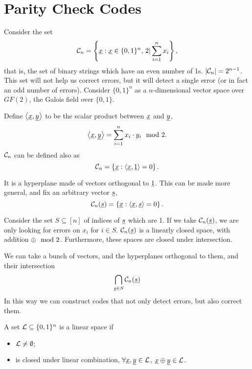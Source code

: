 \section{Parity Check Codes}

Consider the set
\begin{equation*}
	\mathcal{C}_n
	=
	\left\{
		\underline{x} : \underline{x} \in \{0, 1\}^n, \,
		2 | \sum_{i=1}^n x_i
	\right\},
\end{equation*}
that is, the set of binary strings which have an even number of 1s.
$\left|{\mathcal{C}_n}\right| = 2^{n-1}$.
This set will not help us correct errors, but it will detect a single error (or in fact an odd number of errors).
Consider $\{0, 1\}^n$ as a $n$-dimensional vector space over $GF(2)$, the Galois field over $\{0,1\}$.

Define $\left< {\underline{x}}, {\underline{y}} \right>$ to be the scalar product between $\underline{x}$ and $\underline{y}$, \ie
\begin{equation*}
	\left< {\underline{x}}, {\underline{y}} \right> = \sum_{i = 1}^n x_i \cdot y_i \mod 2.
\end{equation*}
$\mathcal{C}_n$ can be defined also as
\begin{equation*}
	\mathcal{C}_n = \left\{ \underline{x} : \left< {\underline{x}}, {\underline{1}} \right> = 0 \right\}.
\end{equation*}

It is a hyperplane made of vectors orthogonal to $\underline{1}$.
This can be made more general, and fix an arbitrary vector $\underline{s}$,
\begin{equation*}
	\mathcal{C}_n(\underline{s}) = \left\{ \underline{x} : \left< {\underline{x}}, {\underline{s}} \right> = 0 \right\}.
\end{equation*}

Consider the set $S \subseteq [n]$ of indices of $\underline{s}$ which are 1.
If we take $\mathcal{C}_n(\underline{s})$, we are only looking for errors on $x_i$ for $i \in S$.
$\mathcal{C}_n(\underline{s})$ is a linearly closed space, with addition $\oplus \mod 2$.
Furthermore, these spaces are closed under intersection.

We can take a bunch of vectors, and the hyperplanes orthogonal to them, and their intersection
\begin{equation*}
	\bigcap_{\underline{s} \in S} \mathcal{C}_n(\underline{s})
\end{equation*}
In this way we can construct codes that not only detect errors, but also correct them.

A set $\mathcal{L} \subseteq \{0,1\}^n$ is a linear space if
\begin{itemize}
	\item $\mathcal{L} \neq \emptyset$;
	\item is closed under linear combination, \ie $\forall \underline{x}, \underline{y} \in \mathcal{L}$, $\underline{x} \oplus \underline{y} \in \mathcal{L}$.
\end{itemize}


